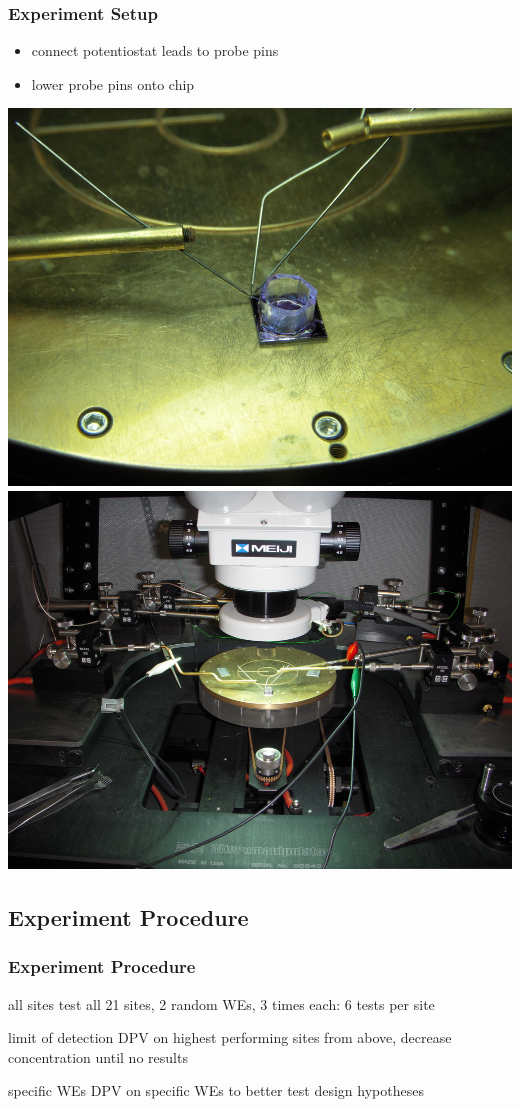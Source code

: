 \documentclass[10pt]{beamer}
\begin{document}
\begin{frame}
	\frametitle{Experiment Setup}
	\begin{itemize}
		\item connect potentiostat leads to probe pins
		\item lower probe pins onto chip
	\end{itemize}
	\includegraphics[width=0.5\linewidth]{figures/chippins.png}
	\includegraphics[width=0.5\linewidth]{figures/potentiostatleads.png}
\end{frame}

\subsection{Experiment Procedure}
\begin{frame}
	\frametitle{Experiment Procedure}
	\begin{block}{all sites}
		test all 21 sites, 2 random WEs, 3 times each: 6 tests per site
	\end{block}
	\begin{block}{limit of detection}
		DPV on highest performing sites from above, decrease concentration until no results
	\end{block}
	\begin{block}{specific WEs}
		DPV on specific WEs to better test design hypotheses
	\end{block}
\end{frame}
\end{document}
